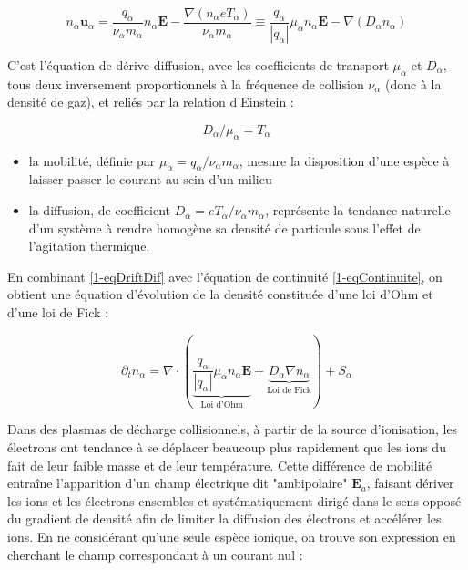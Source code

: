 \begin{refsection}
\begin{equation}
\label{1-eqDriftDif}
n_\alpha\mathbf u_\alpha=\frac{q_\alpha}{\nu_\alpha m_\alpha}n_\alpha\mathbf
E-\frac{\nabla\left(n_\alpha eT_\alpha\right)}{\nu_\alpha
m_\alpha}\equiv\frac{q_\alpha}{|q_\alpha|}\mu_\alpha n_\alpha\mathbf
E-{\nabla\left(D_\alpha n_\alpha\right)}
\end{equation}

C'est l'équation de dérive-diffusion, avec les coefficients de
transport $\mu_\alpha$ et $D_\alpha$, tous deux
inversement proportionnels à la fréquence de collision $\nu_\alpha$ (donc à la
densité de gaz), et reliés par la relation d'Einstein :

\begin{equation}
\label{1-EinsteinRelation}
D_\alpha/\mu_\alpha=T_\alpha
\end{equation}

\begin{itemize}
  \item la mobilité, définie par $\mu_\alpha=q_\alpha/\nu_\alpha m_\alpha$,
  mesure la disposition d'une espèce à laisser passer le courant au sein d'un milieu
  \item la diffusion, de coefficient $D_\alpha=eT_\alpha/\nu_\alpha m_\alpha$,
  représente la tendance naturelle d'un système à rendre homogène sa densité de particule sous l'effet
  de l'agitation thermique.
\end{itemize}

En combinant \eqref{1-eqDriftDif} avec l'équation de continuité
\eqref{1-eqContinuite}, on obtient une équation d'évolution de la densité
constituée d'une loi d'Ohm et d'une loi de Fick :
 
\begin{equation}
\label{1-eqDriftDifContinuite}
\partial_t
n_\alpha=\nabla\cdot(\underbrace{\frac{q_\alpha}{|q_\alpha|}\mu_\alpha n_\alpha\mathbf E}_\text{Loi d'Ohm}+\underbrace{D_\alpha{\nabla n_\alpha}}_\text{Loi
de Fick})+S_\alpha
\end{equation}

Dans des plasmas de décharge collisionnels, à partir de la source d'ionisation,
les électrons ont tendance à se déplacer beaucoup plus rapidement que les ions
du fait de leur faible masse et de leur température. Cette différence de
mobilité entraîne l'apparition d'un champ électrique dit "ambipolaire"
$\mathbf E_a$, faisant dériver les ions et les électrons ensembles et
systématiquement dirigé dans le sens opposé du gradient de densité afin de
limiter la diffusion des électrons et accélérer les ions. En ne considérant
qu'une seule espèce ionique, on trouve son expression en cherchant le champ
correspondant à un courant nul :
 

\end{refsection}
